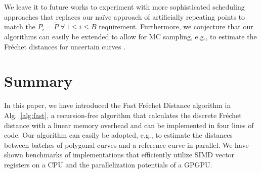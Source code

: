 We leave it to future works to experiment with more sophisticated scheduling approaches that replaces our na\"ive approach of artificially repeating points to match the $P_i = \tilde P \; \forall \, 1 \le i \le B$ requirement.
Furthermore, we conjecture that our algorithms can easily be extended to allow for MC sampling, e.g., to estimate the Fr\'echet distances for uncertain curves \citep{buchin23}.

\section{Summary}
\label{sec:summary}
In this paper, we have introduced the Fast Fr\'echet Distance algorithm in Alg.~\ref{alg:fast}, a recursion-free algorithm that calculates the discrete Fr\'echet distance with a linear memory overhead and can be implemented in four lines of code.
Our algorithm can easily be adopted, e.g., to estimate the distances between batches of polygonal curves and a reference curve in parallel.
We have shown benchmarks of implementations that efficiently utilize SIMD vector registers on a CPU and the parallelization potentials of a GPGPU.
